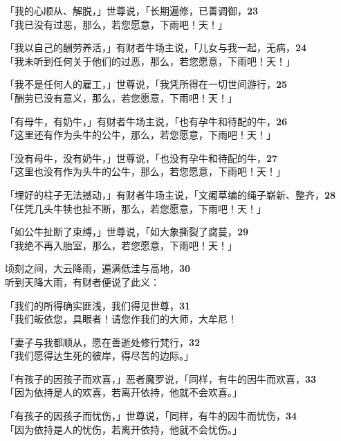「我的心顺从、解脱，」世尊说，「长期遍修，已善调御，\hfill{\grayfootnotesize \textbf{23}} \\
「我已没有过恶，那么，若您愿意，下雨吧！天！」


「我以自己的酬劳养活，」有财者牛场主说，「儿女与我一起，无病，\hfill{\grayfootnotesize \textbf{24}} \\
「我未听到任何关于他们的过恶，那么，若您愿意，下雨吧！天！」


「我不是任何人的雇工，」世尊说，「我凭所得在一切世间游行，\hfill{\grayfootnotesize \textbf{25}} \\
「酬劳已没有意义，那么，若您愿意，下雨吧！天！」


「有母牛，有奶牛，」有财者牛场主说，「也有孕牛和待配的牛，\hfill{\grayfootnotesize \textbf{26}} \\
「这里还有作为头牛的公牛，那么，若您愿意，下雨吧！天！」


「没有母牛，没有奶牛，」世尊说，「也没有孕牛和待配的牛，\hfill{\grayfootnotesize \textbf{27}} \\
「这里也没有作为头牛的公牛，那么，若您愿意，下雨吧！天！」


「埋好的柱子无法撼动，」有财者牛场主说，「文阇草编的绳子崭新、整齐，\hfill{\grayfootnotesize \textbf{28}} \\
「任凭几头牛犊也扯不断，那么，若您愿意，下雨吧！天！」


「如公牛扯断了束缚，」世尊说，「如大象撕裂了腐蔓，\hfill{\grayfootnotesize \textbf{29}} \\
「我绝不再入胎室，那么，若您愿意，下雨吧！天！」


顷刻之间，大云降雨，遍满低洼与高地，\hfill{\grayfootnotesize \textbf{30}} \\
听到天降大雨，有财者便说了此义：


「我们的所得确实匪浅，我们得见世尊，\hfill{\grayfootnotesize \textbf{31}} \\
「我们皈依您，具眼者！请您作我们的大师，大牟尼！


「妻子与我都顺从，愿在善逝处修行梵行，\hfill{\grayfootnotesize \textbf{32}} \\
「我们愿得达生死的彼岸，得尽苦的边际。」


「有孩子的因孩子而欢喜，」恶者魔罗说，「同样，有牛的因牛而欢喜，\hfill{\grayfootnotesize \textbf{33}} \\
「因为依持是人的欢喜，若离开依持，他就不会欢喜。」


「有孩子的因孩子而忧伤，」世尊说，「同样，有牛的因牛而忧伤，\hfill{\grayfootnotesize \textbf{34}} \\
「因为依持是人的忧伤，若离开依持，他就不会忧伤。」


